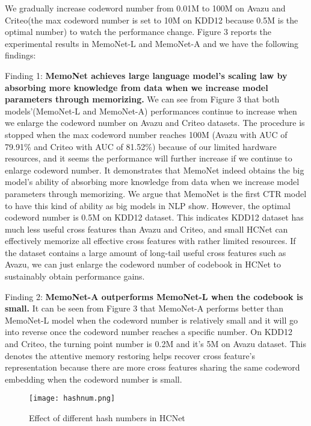 \documentclass[sigconf,authorversion]{acmart}
\begin{document}
We gradually increase codeword number from 0.01M to 100M on Avazu and Criteo(the max codeword number is set to 10M on KDD12 because 0.5M is the optimal number) to watch the performance change. Figure 3 reports the experimental results in MemoNet-L  and MemoNet-A and we have the following findings:

Finding 1:\textbf{ MemoNet achieves large language model's scaling law by absorbing more knowledge from data when we increase model parameters through memorizing.} We can see from Figure 3 that both models'(MemoNet-L and MemoNet-A) performances continue to increase when we enlarge the codeword number on Avazu and Criteo datasets. The procedure is stopped when the max codeword number reaches 100M (Avazu with AUC of 79.91\% and Criteo with AUC of 81.52\%) because of our limited hardware resources, and it seems the performance will further increase if we continue to enlarge codeword number. It demonstrates that MemoNet indeed obtains the big model's ability of absorbing more knowledge from data when we increase model parameters through memorizing. We argue that MemoNet is the first CTR model to have this kind of ability as big models in NLP show.  However, the optimal codeword number is 0.5M on KDD12 dataset. This indicates KDD12 dataset has much less useful cross features than Avazu and Criteo, and small HCNet can effectively memorize all effective cross features with rather limited resources. If the dataset contains a large amount of long-tail useful cross features such as Avazu, we can just enlarge the codeword number of codebook in HCNet to sustainably obtain performance gains. 
 
Finding 2:\textbf{ MemoNet-A outperforms MemoNet-L when the codebook is small.} It can be seen from Figure 3 that MemoNet-A performs better than MemoNet-L model when the codeword number is relatively small and it will go into reverse once the codeword number reaches a specific number. On KDD12 and Criteo, the turning point number is 0.2M and it's 5M on Avazu dataset. This denotes the attentive memory restoring helps recover cross feature's representation because there are more cross features sharing the same codeword embedding when the codeword number is small.
\begin{figure}[h]
  \centering
\texttt{[image: hashnum.png]}
  \caption{Effect of different hash numbers in HCNet}
  \Description{}
\end{figure}
\end{document}
